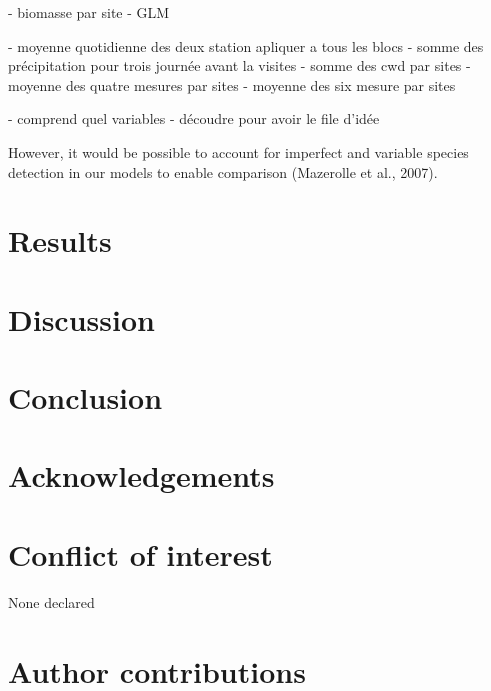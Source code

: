 - biomasse par site
- GLM

- moyenne quotidienne des deux station apliquer a tous les blocs
- somme des précipitation pour trois journée avant la visites
- somme des cwd par sites
- moyenne des quatre mesures par sites
- moyenne des six mesure par sites


- comprend quel variables
- découdre pour avoir le file d'idée




However, it would be possible to account for imperfect and variable species detection in our models to enable comparison (Mazerolle et al., 2007).

\clearpage

\section*{Results}
\label{sec:results1}

\clearpage

\section*{Discussion}
\label{sec:discu1}

\section*{Conclusion}
\label{sec:conclu1}

\section*{Acknowledgements}
\label{sec:acknowl1}

\section*{Conflict of interest}
\label{sec:conflict1}

None declared

\section*{Author contributions}
\label{sec:author1}

\cleardoublepage


\begin{otherlanguage}{english}


\end{otherlanguage}
